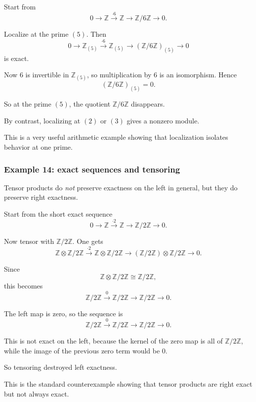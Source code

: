\documentclass[12pt,a4paper]{article}
\theoremstyle{notespace}
\theoremstyle{definition}
\begin{document}
Start from
\[
0 \longrightarrow \mathbb Z \xrightarrow{\cdot 6} \mathbb Z \longrightarrow \mathbb Z/6\mathbb Z \longrightarrow 0.
\]

Localize at the prime \((5)\). Then
\[
0 \longrightarrow \mathbb Z_{(5)} \xrightarrow{\cdot 6} \mathbb Z_{(5)} \longrightarrow (\mathbb Z/6\mathbb Z)_{(5)} \longrightarrow 0
\]
is exact.

Now \(6\) is invertible in \(\mathbb Z_{(5)}\), so multiplication by \(6\) is an isomorphism. Hence
\[
(\mathbb Z/6\mathbb Z)_{(5)}=0.
\]

So at the prime \((5)\), the quotient \(\mathbb Z/6\mathbb Z\) disappears.

By contrast, localizing at \((2)\) or \((3)\) gives a nonzero module.

This is a very useful arithmetic example showing that localization isolates behavior at one prime.

\subsubsection{Example 14: exact sequences and tensoring}

Tensor products do \emph{not} preserve exactness on the left in general, but they do preserve right exactness.

Start from the short exact sequence
\[
0 \longrightarrow \mathbb Z \xrightarrow{\cdot 2} \mathbb Z \longrightarrow \mathbb Z/2\mathbb Z \longrightarrow 0.
\]

Now tensor with \(\mathbb Z/2\mathbb Z\). One gets
\[
\mathbb Z\otimes \mathbb Z/2\mathbb Z
\xrightarrow{\cdot 2}
\mathbb Z\otimes \mathbb Z/2\mathbb Z
\longrightarrow
(\mathbb Z/2\mathbb Z)\otimes \mathbb Z/2\mathbb Z
\longrightarrow 0.
\]

Since
\[
\mathbb Z\otimes \mathbb Z/2\mathbb Z \cong \mathbb Z/2\mathbb Z,
\]
this becomes
\[
\mathbb Z/2\mathbb Z
\xrightarrow{0}
\mathbb Z/2\mathbb Z
\longrightarrow
\mathbb Z/2\mathbb Z
\longrightarrow 0.
\]

The left map is zero, so the sequence is
\[
\mathbb Z/2\mathbb Z
\xrightarrow{0}
\mathbb Z/2\mathbb Z
\longrightarrow
\mathbb Z/2\mathbb Z
\longrightarrow 0.
\]

This is not exact on the left, because the kernel of the zero map is all of \(\mathbb Z/2\mathbb Z\), while the image of the previous zero term would be \(0\).

So tensoring destroyed left exactness.

This is the standard counterexample showing that tensor products are right exact but not always exact.
\end{document}
